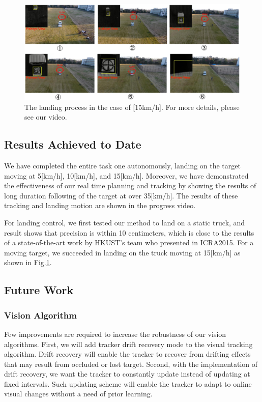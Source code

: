 \documentclass{standalone}
\begin{document}
\begin{figure}[b]
    \begin{center}
      \includegraphics[clip, bb= 0 0 720 315, width=1.0\columnwidth]{sections/task1/images/task1_landing.eps}
    \end{center}
    \caption{The landing process in the case of [15km/h]. For more details, please see our video.}
    \label{figure:landing}
\end{figure}

\subsection{Results Achieved to Date}

We have completed the entire task one autonomously, landing on the 
target moving at 5[km/h], 10[km/h], and 15[km/h]. Moreover, we have demonstrated the effectiveness of our real time planning and tracking by showing the results of long duration
following of the target at over 35[km/h]. The results of these tracking and landing motion are shown in the progress video. %

For landing control, we first tested our method to land on a static truck, and result shows that precision is within 10 centimeters, which is close to the results of a state-of-the-art work by HKUST's team who presented in ICRA2015. For a moving target, we succeeded in landing on the truck moving at 15[km/h] as shown in Fig.\ref{figure:landing}.



\subsection{Future Work}
\subsubsection{Vision Algorithm}
Few improvements are required to increase the robustness of our
vision algorithms. First, we will add tracker drift recovery mode to
the visual tracking algorithm. Drift recovery will enable the
tracker to recover from drifting effects that may result from
occluded or lost target. Second, with the implementation of drift
recovery, we want the tracker to constantly update instead of updating at fixed
intervals. Such updating scheme will enable the tracker to adapt to
online visual changes without a need of prior learning.
\end{document}
